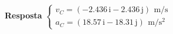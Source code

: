 \begin{flushright}
	\textbf{Resposta}
	$
	\begin{cases}
		v_{C}=(-2.436\,\textrm{i}-2.436\,\textrm{j})\,\SI{}{\meter/\second}\\
		a_{C}=(18.57\,\textrm{i}-18.31\,\textrm{j})\,\SI{}{\meter/\second^{2}}
	\end{cases}
	$
\end{flushright}